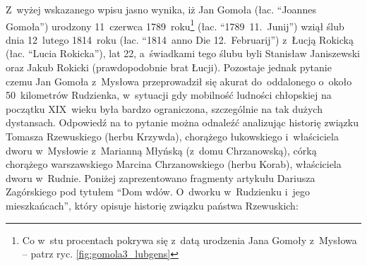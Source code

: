 Z~wyżej wskazanego wpisu jasno wynika, iż Jan Gomoła (łac. \enquote{Joannes 
Gomoła}) urodzony 11~czerwca 1789~roku\footnote{Co w~stu procentach pokrywa 
się z~datą urodzenia Jana Gomoły z~Mysłowa -- patrz ryc. 
\ref{fig:gomola3_lubgens}} (łac. \enquote{1789~11.~Junij}) wziął ślub dnia 
12~lutego 1814~roku (łac. \enquote{1814~anno Die 12.~Februarij}) z~Łucją 
Rokicką (łac. \enquote{Lucia Rokicka}), lat 22, a~świadkami tego ślubu byli 
Stanisław Janiszewski oraz Jakub Rokicki (prawdopodobnie brat Łucji).
Pozostaje jednak pytanie czemu Jan Gomoła z~Mysłowa przeprowadził się akurat
do~oddalonego o~około 50~kilometrów Rudzienka, w~sytuacji gdy mobilność
ludności chłopskiej na początku XIX~wieku była bardzo ograniczona, szczególnie
na tak dużych dystansach. Odpowiedź na to pytanie można odnaleźć analizując
historię związku Tomasza Rzewuskiego (herbu Krzywda), chorążego łukowskiego
i~właściciela dworu w~Mysłowie  z~Marianną Młyńską (z~domu Chrzanowską), córką
chorążego warszawskiego Marcina Chrzanowskiego (herbu Korab), właściciela
dworu w~Rudnie. Poniżej zaprezentowano fragmenty artykułu Dariusza Zagórskiego
pod tytułem \enquote{Dom wdów. O~dworku w~Rudzienku i~jego mieszkańcach},
który opisuje historię związku państwa Rzewuskich:

